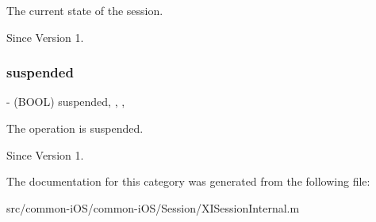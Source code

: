 The current state of the session. 

\begin{DoxySince}{Since}
Version 1. 
\end{DoxySince}
\hypertarget{category_x_i_session_internal_07_08_aa7c7df651a614de08864a6ddfbba1165}{}\label{category_x_i_session_internal_07_08_aa7c7df651a614de08864a6ddfbba1165} 
\subsubsection{\texorpdfstring{suspended}{suspended}}
{\footnotesize\ttfamily -\/ (B\+O\+OL) suspended\hspace{0.3cm}{\ttfamily [read]}, {\ttfamily [write]}, {\ttfamily [nonatomic]}, {\ttfamily [assign]}}



The operation is suspended. 

\begin{DoxySince}{Since}
Version 1. 
\end{DoxySince}


The documentation for this category was generated from the following file\+:\begin{DoxyCompactItemize}
\item 
src/common-\/i\+O\+S/common-\/i\+O\+S/\+Session/X\+I\+Session\+Internal.\+m\end{DoxyCompactItemize}
